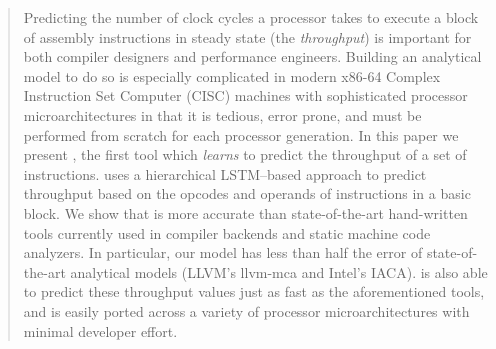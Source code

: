 \begin{abstract}

Predicting the number of clock cycles a processor takes to execute a block of assembly instructions in steady state (the \emph{throughput}) is important for both compiler designers and performance engineers.
Building an analytical model to do so is especially complicated in modern x86-64 Complex Instruction Set Computer (CISC) machines with sophisticated processor microarchitectures in that it is tedious, error prone, and must be performed from scratch for each processor generation.
In this paper we present \tool{}, the first tool which \emph{learns} to predict the throughput of a set of instructions.
\tool{} uses a hierarchical LSTM--based approach to predict throughput based on the opcodes and operands of instructions in a basic block.
We show that \tool{} is more accurate than state-of-the-art hand-written tools currently used in compiler backends and static machine code analyzers.
In particular, our model has less than half the error of state-of-the-art analytical models (LLVM's llvm-mca and Intel's IACA).
\tool{} is also able to predict these throughput values just as fast as the aforementioned tools, and is easily ported across a variety of processor microarchitectures with minimal developer effort.

\end{abstract}
